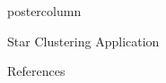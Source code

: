 \documentclass{beamer}
\begin{document}
\begin{frame}
\begin{columns}
\begin{column}{.5\textwidth}
\begin{beamercolorbox}[center]{postercolumn}
\begin{minipage}{.98\textwidth}
{\begin{myblock}{Star Clustering Application}
     \end{myblock}\vfill
					\begin{myblock}{References}
						\footnotesize
						
						
					\end{myblock}\vfill
		}\end{minipage}\end{beamercolorbox}
	\end{column}
\end{columns}
\end{frame}
\end{document}
